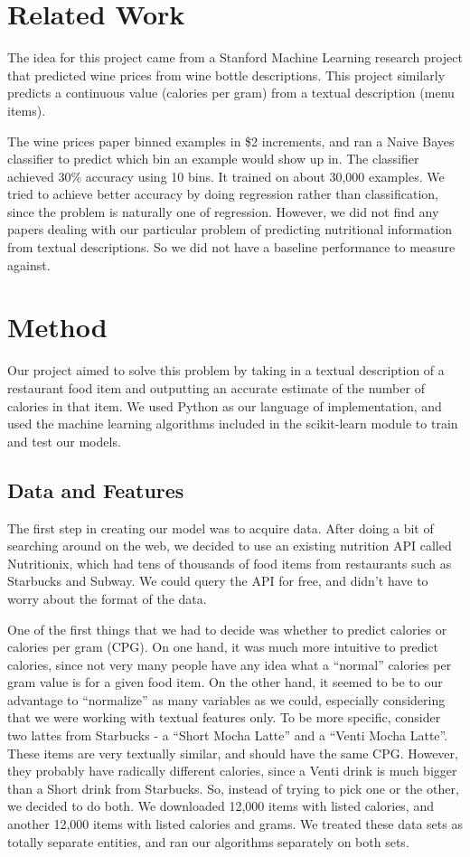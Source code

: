 \documentclass{article}
\begin{document}
\section{Related Work}
The idea for this project came from a Stanford Machine Learning research project\cite{standfordPaper} that predicted wine prices from wine bottle descriptions. This project similarly predicts a continuous value (calories per gram) from a textual description (menu items).

The wine prices paper binned examples in \$2 increments, and ran a Naive Bayes classifier to predict which bin an example would show up in. The classifier achieved 30\% accuracy using 10 bins. It trained on about 30,000 examples. We tried to achieve better accuracy by doing regression rather than classification, since the problem is naturally one of regression. However, we did not find any papers dealing with our particular problem of predicting nutritional information from textual descriptions. So we did not have a baseline performance to measure against.

\section{Method}
Our project aimed to solve this problem by taking in a textual description of a restaurant food item and outputting an accurate estimate of the number of calories in that item. We used Python as our language of implementation, and used the machine learning algorithms included in the scikit-learn\cite{scikitLearn} module to train and test our models.

\subsection{Data and Features}
The first step in creating our model was to acquire data. After doing a bit of searching around on the web, we decided to use an existing nutrition API called Nutritionix\cite{nutritionix}, which had tens of thousands of food items from restaurants such as Starbucks and Subway. We could query the API for free, and didn’t have to worry about the format of the data.

One of the first things that we had to decide was whether to predict calories or calories per gram (CPG). On one hand, it was much more intuitive to predict calories, since not very many people have any idea what a “normal” calories per gram value is for a given food item. On the other hand, it seemed to be to our advantage to “normalize” as many variables as we could, especially considering that we were working with textual features only. To be more specific, consider two lattes from Starbucks - a “Short Mocha Latte” and a “Venti Mocha Latte”. These items are very textually similar, and should have the same CPG. However, they probably have radically different calories, since a Venti drink is much bigger than a Short drink from Starbucks. So, instead of trying to pick one or the other, we decided to do both. We downloaded 12,000 items with listed calories, and another 12,000 items with listed calories and grams. We treated these data sets as totally separate entities, and ran our algorithms separately on both sets.
\end{document}
